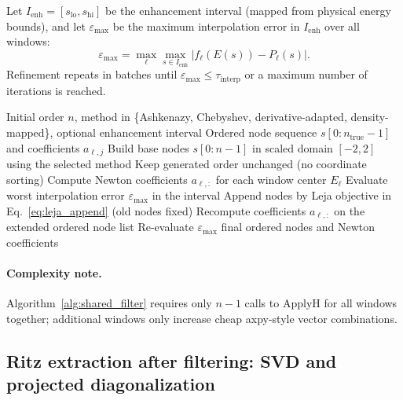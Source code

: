 Let $I_{\mathrm{enh}}=[s_{\mathrm{lo}},s_{\mathrm{hi}}]$ be the enhancement
interval (mapped from physical energy bounds), and let
$\varepsilon_{\max}$ be the maximum interpolation error in $I_{\mathrm{enh}}$
over all windows:
\begin{equation}
\varepsilon_{\max}
= \max_{\ell}\max_{s\in I_{\mathrm{enh}}}
\left|f_\ell(E(s)) - P_\ell(s)\right|.
\end{equation}
Refinement repeats in batches until
$\varepsilon_{\max}\le \tau_{\mathrm{interp}}$ or a maximum number of
iterations is reached.

\begin{algorithm}[t]
\caption{Node generation and ordering for stable Newton interpolation}
\label{alg:node_strategy}
\begin{algorithmic}[1]
\Require Initial order $n$, method in \{Ashkenazy, Chebyshev, derivative-adapted, density-mapped\}, optional enhancement interval
\Ensure Ordered node sequence $s[0{:}n_{\mathrm{true}}-1]$ and coefficients $a_{\ell,j}$
\State Build base nodes $s[0{:}n-1]$ in scaled domain $[-2,2]$ using the selected method
\State Keep generated order unchanged (no coordinate sorting)
\State Compute Newton coefficients $a_{\ell,:}$ for each window center $E_\ell$
  \State Evaluate worst interpolation error $\varepsilon_{\max}$ in the interval
    \State Append nodes by Leja objective in Eq.~\eqref{eq:leja_append} (old nodes fixed)
    \State Recompute coefficients $a_{\ell,:}$ on the extended ordered node list
    \State Re-evaluate $\varepsilon_{\max}$
  \EndWhile
\EndIf
\State \Return final ordered nodes and Newton coefficients
\end{algorithmic}
\end{algorithm}

\paragraph{Complexity note.}
Algorithm~\ref{alg:shared_filter} requires only $n-1$ calls to
$\mathrm{ApplyH}$ for all windows together; additional windows only increase
cheap axpy-style vector combinations.

\subsection{Ritz extraction after filtering: SVD and projected diagonalization}

